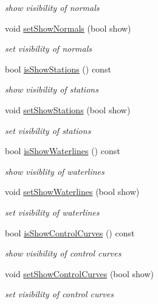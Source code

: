 \begin{DoxyCompactItemize}
\begin{DoxyCompactList}\small\item\em show visibility of normals \end{DoxyCompactList}\item 
void \hyperlink{classShipCAD_1_1Visibility_a78971bef725cdc53fa600589d68b628a}{set\-Show\-Normals} (bool show)
\begin{DoxyCompactList}\small\item\em set visibility of normals \end{DoxyCompactList}\item 
bool \hyperlink{classShipCAD_1_1Visibility_a02ae626d57305729ff870e14dd7f6e26}{is\-Show\-Stations} () const 
\begin{DoxyCompactList}\small\item\em show visibility of stations \end{DoxyCompactList}\item 
void \hyperlink{classShipCAD_1_1Visibility_a41a2754fcdbe69609b837fc9be26135e}{set\-Show\-Stations} (bool show)
\begin{DoxyCompactList}\small\item\em set visibility of stations \end{DoxyCompactList}\item 
bool \hyperlink{classShipCAD_1_1Visibility_a5ada95979a3d66b792b394f7c065b1fd}{is\-Show\-Waterlines} () const 
\begin{DoxyCompactList}\small\item\em show visiblity of waterlines \end{DoxyCompactList}\item 
void \hyperlink{classShipCAD_1_1Visibility_ac07b5944afd8a44c569aef09ee893450}{set\-Show\-Waterlines} (bool show)
\begin{DoxyCompactList}\small\item\em set visibility of waterlines \end{DoxyCompactList}\item 
bool \hyperlink{classShipCAD_1_1Visibility_adf96eb2133086a34056f6c0f75556f13}{is\-Show\-Control\-Curves} () const 
\begin{DoxyCompactList}\small\item\em show visibility of control curves \end{DoxyCompactList}\item 
void \hyperlink{classShipCAD_1_1Visibility_a760ef76f6db721925ee95cefaae966de}{set\-Show\-Control\-Curves} (bool show)
\begin{DoxyCompactList}\small\item\em set visibility of control curves \end{DoxyCompactList}\item 

\end{DoxyCompactItemize}
